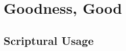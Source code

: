 \section{Goodness, Good}
	\label{GOODNESS}
	





\subsection{Scriptural Usage} %
	\label{GOODNESS-SCRIPTURES}

	
	
